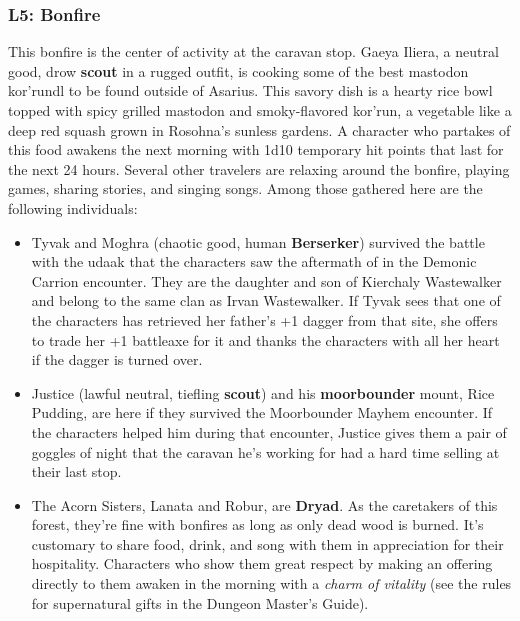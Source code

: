 \documentclass[10pt,a4,twoside,twocolumn,openany,nodeprecatedcode]{dndbook}
\begin{document}
\subsubsection{L5: Bonfire}
This bonfire is the center of activity at the caravan stop. Gaeya Iliera, a neutral good, drow \textbf{scout} in a rugged outfit, is cooking some of the best mastodon kor'rundl to be found outside of Asarius. This savory dish is a hearty rice bowl topped with spicy grilled mastodon and smoky-flavored kor'run, a vegetable like a deep red squash grown in Rosohna's sunless gardens. A character who partakes of this food awakens the next morning with 1d10 temporary hit points that last for the next 24 hours.
Several other travelers are relaxing around the bonfire, playing games, sharing stories, and singing songs. Among those gathered here are the following individuals:
\begin{itemize}

\item Tyvak and Moghra (chaotic good, human \textbf{Berserker}) survived the battle with the udaak that the characters saw the aftermath of in the Demonic Carrion encounter. They are the daughter and son of Kierchaly Wastewalker and belong to the same clan as Irvan Wastewalker. If Tyvak sees that one of the characters has retrieved her father's +1 dagger from that site, she offers to trade her +1 battleaxe for it and thanks the characters with all her heart if the dagger is turned over.
\item Justice (lawful neutral, tiefling \textbf{scout}) and his \textbf{moorbounder} mount, Rice Pudding, are here if they survived the Moorbounder Mayhem encounter. If the characters helped him during that encounter, Justice gives them a pair of goggles of night that the caravan he's working for had a hard time selling at their last stop.
\item The Acorn Sisters, Lanata and Robur, are \textbf{Dryad}. As the caretakers of this forest, they're fine with bonfires as long as only dead wood is burned. It's customary to share food, drink, and song with them in appreciation for their hospitality. Characters who show them great respect by making an offering directly to them awaken in the morning with a \textit{charm of vitality} (see the rules for supernatural gifts in the Dungeon Master's Guide).
\end{itemize}
\end{document}
